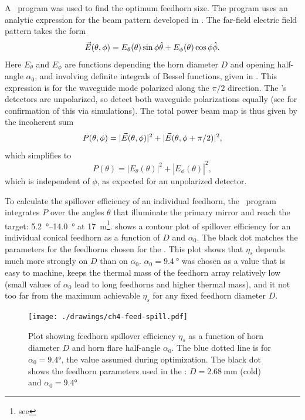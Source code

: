 A \MATLAB\ program was used to find the optimum feedhorn size.
The program uses an analytic expression for the beam pattern developed in \cite{green_radiation_2006,narasimhan_modes_1971,}.
The far-field electric field pattern takes the form
\begin{equation}
    \vec{E}(\theta,\phi) = E_{\theta}(\theta) \sin{\phi} \hat{\theta} + E_{\phi}(\theta) \cos{\phi} \hat{\phi}.
\end{equation}
Here $E_{\theta}$ and $E_{\phi}$ are functions depending the horn diameter $D$ and opening half-angle $\alpha_0$, and involving definite integrals of Bessel functions, given in .
This expression is for the waveguide mode polarized along the $\pi/2$ direction.
The \Imager's detectors are unpolarized, so detect both waveguide polarizations equally (see  for confirmation of this via simulations).
The total power beam map is thus given by the incoherent sum
\begin{equation}
    P(\theta, \phi) = |\vec{E}(\theta, \phi)|^2 + |\vec{E}(\theta, \phi+\pi/2)|^2,
\end{equation}
which simplifies to 
\begin{equation}
    P(\theta) = |E_{\theta}(\theta)|^2 + |E_{\phi}(\theta)|^2,
\end{equation}
which is independent of $\phi$, as expected for an unpolarized detector.

To calculate the spillover efficiency of an individual feedhorn, the \MATLAB\ program integrates $P$ over the angles $\theta$ that illuminate the primary mirror and reach the target: \SIrange{5.2}{14.0}{\degree} at \SI{17}{\m}\footnote{see }.
 shows a contour plot of spillover efficiency for an individual conical feedhorn as a function of $D$ and $\alpha_0$.
The black dot matches the parameters for the feedhorns chosen for the \Imager.
This plot shows that $\eta_s$ depends much more strongly on $D$ than on $\alpha_0$.
$\alpha_0 = \SI{9.4}{\degree}$ was chosen as a value that is easy to machine, keeps the thermal mass of the feedhorn array relatively low (small values of $\alpha_0$ lead to long feedhorns and higher thermal mass), and it not too far from the maximum achievable $\eta_s$ for any fixed feedhorn diameter $D$.

\begin{figure}
\centering
\texttt{[image: ./drawings/ch4-feed-spill.pdf]}
\caption[Feedhorn spillover efficiency]{
  Plot showing feedhorn spillover efficiency $\eta_s$ as a function of horn diameter $D$ and horn flare half-angle $\alpha_0$.
  The blue dotted line is for $\alpha_0 = \ang{9.4}$, the value assumed during optimization.
  The black dot shows the feedhorn parameters used in the \Imager: $D = \SI{2.68}{\mm}$ (cold) and $\alpha_0 = \ang{9.4}$
}
\label{fig:ch4-feed-spill}
\end{figure}


